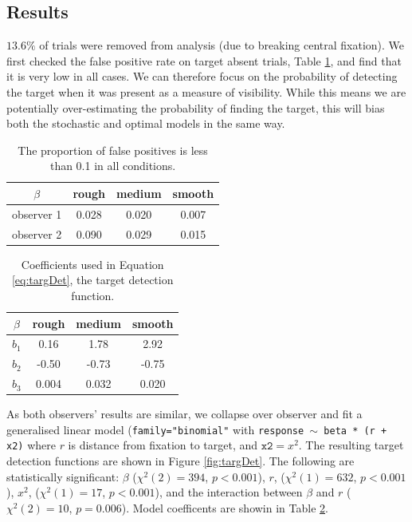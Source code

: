 \documentclass[preprint, authoryear]{elsarticle} %
\begin{document}
\subsection{Results}

$13.6\%$ of trials were removed from analysis (due to breaking central fixation). We first checked the false positive rate on target absent trials, Table \ref{tab:falsepostives}, and find that it is very low in all cases. We can therefore focus on the probability of detecting the target when it was present as a measure of visibility. While this means we are potentially over-estimating the probability of finding the target, this will bias both the stochastic and optimal models in the same way.

\begin{table}
\centering
\begin{tabular}{c|ccc}
$\beta$	& rough & medium & smooth \\
\hline
observer 1 	& 0.028 & 0.020 & 0.007 \\
observer 2	& 0.090 & 0.029 & 0.015 \\
\end{tabular}
\caption{The proportion of false positives is less than 0.1 in all conditions.}
\label{tab:falsepostives}
\end{table}

\begin{table}
\centering
\begin{tabular}{c|ccc}
$\beta$	& rough & medium & smooth \\
\hline
$b_1$ 	& 0.16 & 1.78 & 2.92 \\
$b_2$	& -0.50 & -0.73 & -0.75 \\
$b_3$	& 0.004 & 0.032 & 0.020 \\
\end{tabular}
\caption{Coefficients used in Equation \ref{eq:targDet}, the target detection function.}
\label{tab:targdetcoef}
\end{table}

As both observers' results are similar, we collapse over observer and fit a generalised linear model (\texttt{family="binomial"} with \texttt{response $\sim$ beta * (r + x2)} where $r$ is distance from fixation to target, and $\texttt{x2}=x^2$. The resulting target detection functions are shown in Figure \ref{fig:targDet}. The following are statistically significant: $\beta$  ($\chi^2(2)=394$, $p<0.001$), $r$, ($\chi^2(1)=632$, $p<0.001$), $x^2$, ($\chi^2(1)=17$, $p<0.001$), and the interaction between $\beta$ and $r$ ($\chi^2(2)=10$, $p=0.006$). Model coefficents are showin in Table \ref{tab:targdetcoef}. 
\end{document}
